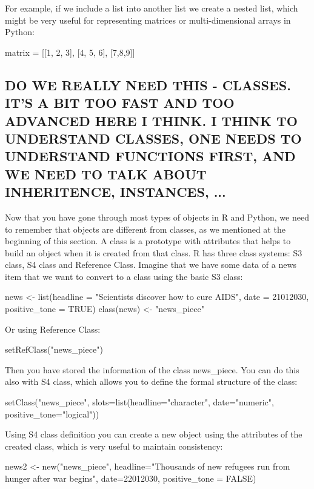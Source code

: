 For example, if we include a list into another list we create a nested list, which might be very useful for representing matrices or multi-dimensional arrays in Python:

\begin{examplepy}
matrix = [[1, 2, 3], [4, 5, 6], [7,8,9]] 
\end{examplepy}	





\subsection{DO WE REALLY NEED THIS - CLASSES. IT'S A BIT TOO FAST AND TOO ADVANCED HERE I THINK. I THINK TO UNDERSTAND CLASSES, ONE NEEDS TO UNDERSTAND FUNCTIONS FIRST, AND WE NEED TO TALK ABOUT INHERITENCE, INSTANCES, ...}

Now that you have gone through most types of objects in R and Python, we need to remember that objects are different from classes, as we mentioned at the beginning of this section. A class is a prototype with attributes that helps to build an object when it is created from that class. R has three class systems: S3 class, S4 class and Reference Class.  Imagine that we have some data of a news item that we want to convert to a class using the basic S3 class:

\begin{exampler}
news <- list(headline = "Scientists discover how to cure AIDS", date = 21012030, positive_tone = TRUE)
class(news) <- "news_piece"
\end{exampler}

Or using Reference Class:

\begin{exampler}
setRefClass("news_piece")
\end{exampler}

Then you have stored the information of the class news\_piece.  You can do this also with S4 class, which allows you to define the formal structure of the class:

\begin{exampler}
setClass("news_piece", slots=list(headline="character", date="numeric", positive_tone="logical"))
\end{exampler}

Using S4 class definition you can create a new object using the attributes of the created class, which is very useful to maintain consistency:

\begin{exampler}
news2 <- new("news_piece", headline="Thousands of new refugees run from hunger after war begins", date=22012030, positive_tone = FALSE)
\end{exampler}

